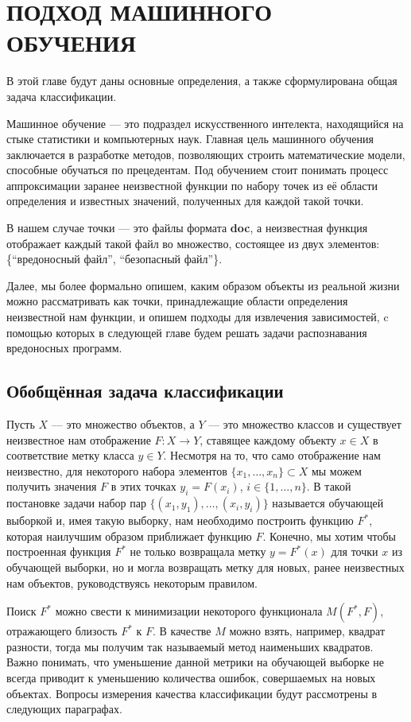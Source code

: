 \chapter{ПОДХОД МАШИННОГО ОБУЧЕНИЯ}

В этой главе будут даны основные определения, а также  сформулирована общая задача классификации.

Машинное обучение — это подраздел искусственного интелекта, находящийся на стыке статистики и компьютерных наук. Главная цель машинного обучения заключается в разработке методов, позволяющих строить математические модели, способные обучаться по прецедентам. Под обучением стоит понимать процесс аппроксимации заранее неизвестной функции по набору точек из её области определения и известных значений, полученных для каждой такой точки.

В нашем случае точки — это файлы формата \textbf{doc}, а неизвестная функция отображает каждый такой файл во множество, состоящее из двух элементов: \{“вредоносный файл”, “безопасный файл”\}.

Далее, мы более формально опишем, каким образом объекты  из реальной жизни можно рассматривать как точки, принадлежащие области определения неизвестной нам функции, и опишем подходы для извлечения зависимостей, c помощью которых в следующей главе будем решать задачи распознавания вредоносных программ.

\section{Обобщённая задача классификации}

Пусть $X$ — это множество объектов, а $Y$ — это множество классов и существует неизвестное нам отображение $F : X \to Y$, ставящее каждому объекту $x \in X$ в соответствие метку класса $y \in Y$.
Несмотря на то, что само отображение нам неизвестно, для некоторого набора элементов $\{ x_1, \dots , x_n \} \subset X$ мы можем получить значения $F$ в этих точках  $y_i = F(x_i)$, $i \in \{ 1, \dots, n \}$.
В такой постановке задачи набор пар $\{ (x_1, y_1), \dots, (x_i, y_i) \}$ называется обучающей выборкой и, имея такую выборку, нам необходимо построить функцию $F^*$, которая наилучшим образом приближает функцию $F$.
Конечно, мы хотим чтобы построенная функция $F^*$ не только возвращала метку $y = F^*(x)$ для точки $x$ из обучающей выборки, но и могла возвращать метку для новых, ранее неизвестных нам объектов, руководствуясь некоторым правилом.

Поиск $F^*$ можно свести к минимизации некоторого функционала $M(F^*, F)$, отражающего близость $F^*$ к $F$. В качестве $M$ можно взять, например, квадрат разности, тогда мы получим так называемый метод наименьших квадратов. Важно понимать, что уменьшение данной метрики на обучающей выборке не всегда приводит к уменьшению количества ошибок, совершаемых на новых объектах. Вопросы измерения качества классификации будут рассмотрены в следующих параграфах.

